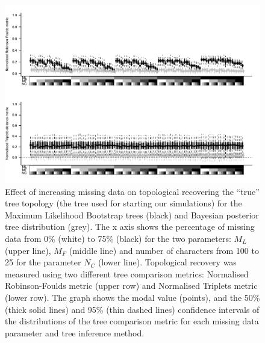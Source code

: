 \documentclass[12pt,letterpaper]{article}
\begin{document}
\begin{figure} 
\centering
    \includegraphics[width=1\textwidth]{SupplementaryFigures/Treesets_True.pdf}
    \caption{Effect of increasing missing data on topological recovering the ``true'' tree topology (the tree used for starting our simulations) for the Maximum Likelihood Bootstrap trees (black) and Bayesian posterior tree distribution (grey). The x axis shows the percentage of missing data from 0\% (white) to 75\% (black) for the two parameters: $M_{L}$ (upper line), $M_{F}$ (middle line) and number of characters from 100 to 25 for the parameter $N_{C}$ (lower line). Topological recovery was measured using two different tree comparison metrics: Normalised Robinson-Foulds metric (upper row) and Normalised Triplets metric (lower row). The graph shows the modal value (points), and the 50\% (thick solid lines) and 95\% (thin dashed lines) confidence intervals of the distributions of the tree comparison metric for each missing data parameter and tree inference method.} 
\label{Fig_Supp_Treesets_true} 
\end{figure}
\end{document}
